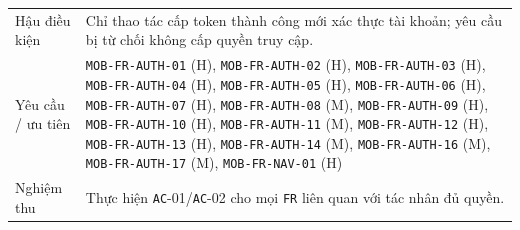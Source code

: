 \begin{longtable}{@{}P{0.20000\SRSWidth}P{0.80000\SRSWidth}@{}}
Hậu điều kiện & Chỉ thao tác cấp token thành công mới xác thực tài khoản; yêu cầu bị từ chối không cấp quyền truy cập. \\[3pt]
Yêu cầu /\allowbreak{} ưu tiên & \texttt{MOB-\allowbreak{}FR-\allowbreak{}AUTH-\allowbreak{}01} (H), \texttt{MOB-\allowbreak{}FR-\allowbreak{}AUTH-\allowbreak{}02} (H), \texttt{MOB-\allowbreak{}FR-\allowbreak{}AUTH-\allowbreak{}03} (H), \texttt{MOB-\allowbreak{}FR-\allowbreak{}AUTH-\allowbreak{}04} (H), \texttt{MOB-\allowbreak{}FR-\allowbreak{}AUTH-\allowbreak{}05} (H), \texttt{MOB-\allowbreak{}FR-\allowbreak{}AUTH-\allowbreak{}06} (H), \texttt{MOB-\allowbreak{}FR-\allowbreak{}AUTH-\allowbreak{}07} (H), \texttt{MOB-\allowbreak{}FR-\allowbreak{}AUTH-\allowbreak{}08} (M), \texttt{MOB-\allowbreak{}FR-\allowbreak{}AUTH-\allowbreak{}09} (H), \texttt{MOB-\allowbreak{}FR-\allowbreak{}AUTH-\allowbreak{}10} (H), \texttt{MOB-\allowbreak{}FR-\allowbreak{}AUTH-\allowbreak{}11} (M), \texttt{MOB-\allowbreak{}FR-\allowbreak{}AUTH-\allowbreak{}12} (H), \texttt{MOB-\allowbreak{}FR-\allowbreak{}AUTH-\allowbreak{}13} (H), \texttt{MOB-\allowbreak{}FR-\allowbreak{}AUTH-\allowbreak{}14} (M), \texttt{MOB-\allowbreak{}FR-\allowbreak{}AUTH-\allowbreak{}16} (M), \texttt{MOB-\allowbreak{}FR-\allowbreak{}AUTH-\allowbreak{}17} (M), \texttt{MOB-\allowbreak{}FR-\allowbreak{}NAV-\allowbreak{}01} (H) \\[3pt]
Nghiệm thu & Thực hiện \texttt{AC}-01/\allowbreak{}\texttt{AC}-02 cho mọi \texttt{FR} liên quan với tác nhân đủ quyền. \\[3pt]
\end{longtable}
\endgroup

